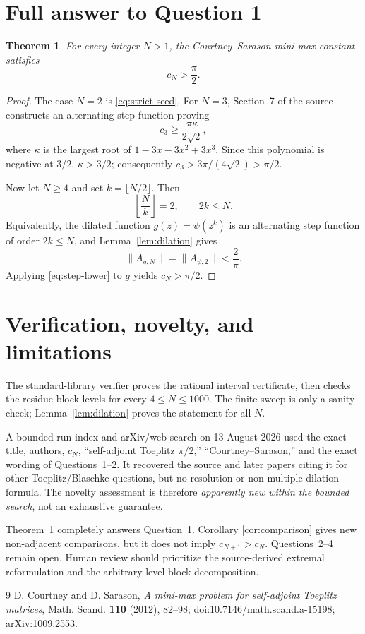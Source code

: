 \documentclass[10pt]{article}
\newtheorem{theorem}{Theorem}
\begin{document}
\section{Full answer to Question 1}

\begin{theorem}\label{thm:main}
For every integer $N>1$, the Courtney--Sarason mini-max constant satisfies
\[
 c_N>\frac\pi2.
\]
\end{theorem}

\begin{proof}
The case $N=2$ is \eqref{eq:strict-seed}. For $N=3$, Section~7 of the source
constructs an alternating step function proving
\[
 c_3\ge\frac{\pi\kappa}{2\sqrt2},
\]
where $\kappa$ is the largest root of
$1-3x-3x^2+3x^3$. Since this polynomial is negative at $3/2$,
$\kappa>3/2$; consequently
$c_3>3\pi/(4\sqrt2)>\pi/2$.

Now let $N\ge4$ and set $k=\lfloor N/2\rfloor$. Then
\[
 \left\lfloor\frac Nk\right\rfloor=2,
 \qquad 2k\le N.
\]
Equivalently, the dilated function $g(z)=\psi(z^k)$ is an alternating step
function of order $2k\le N$, and Lemma~\ref{lem:dilation} gives
\[
 \|A_{g,N}\|=\|A_{\psi,2}\|<\frac2\pi.
\]
Applying \eqref{eq:step-lower} to $g$ yields $c_N>\pi/2$.
\end{proof}

\section{Verification, novelty, and limitations}

The standard-library verifier proves the rational interval certificate, then
checks the residue block levels for every $4\le N\le1000$. The finite sweep is
only a sanity check; Lemma~\ref{lem:dilation} proves the statement for all
$N$.

A bounded run-index and arXiv/web search on 13 August 2026 used the exact title,
authors, $c_N$, ``self-adjoint Toeplitz $\pi/2$,'' ``Courtney--Sarason,'' and
the exact wording of Questions~1--2. It recovered the source and later papers
citing it for other Toeplitz/Blaschke questions, but no resolution or
non-multiple dilation formula. The novelty assessment is therefore
\emph{apparently new within the bounded search}, not an exhaustive guarantee.

Theorem~\ref{thm:main} completely answers Question~1. Corollary
\ref{cor:comparison} gives new non-adjacent comparisons, but it does not imply
$c_{N+1}>c_N$. Questions~2--4 remain open. Human review should prioritize the
source-derived extremal reformulation and the arbitrary-level block
decomposition.

\begin{thebibliography}{9}
D. Courtney and D. Sarason,
\emph{A mini-max problem for self-adjoint Toeplitz matrices},
Math. Scand. \textbf{110} (2012), 82--98;
\href{https://doi.org/10.7146/math.scand.a-15198}{doi:10.7146/math.scand.a-15198};
\href{https://arxiv.org/abs/1009.2553}{arXiv:1009.2553}.
\end{thebibliography}
\end{document}
